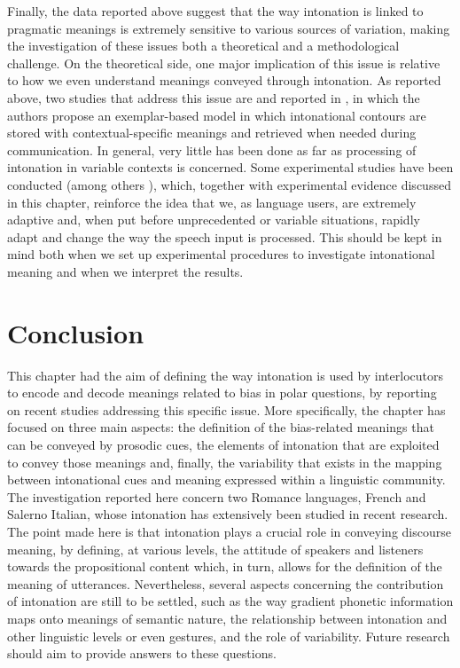 \documentclass[output=paper,colorlinks,citecolor=brown]{langscibook}
\begin{document}
Finally, the data reported above suggest that the way intonation is linked to pragmatic meanings is extremely sensitive to various sources of variation, making the investigation of these issues both a theoretical and a methodological challenge. On the theoretical side, one major implication of this issue is relative to how we even understand meanings conveyed through intonation. As reported above, two studies that address this issue are \citet{portesgerman2019} and \citet{germanportes2020} reported in , in which the authors propose an exemplar-based model in which intonational contours are stored with contextual-specific meanings and retrieved when needed during communication. In general, very little has been done as far as processing of intonation in variable contexts is concerned. Some experimental studies have been conducted (among others \citealt{kurumada2014or, roettger2020aa}), which, together with experimental evidence discussed in this chapter, reinforce the idea that we, as language users, are extremely adaptive and, when put before unprecedented or variable situations, rapidly adapt and change the way the speech input is processed. This should be kept in mind both when we set up experimental procedures to investigate intonational meaning and when we interpret the results.

\section{Conclusion}\label{conclude}
This chapter had the aim of defining the way intonation is used by interlocutors to encode and decode meanings related to bias in polar questions, by reporting on recent studies addressing this specific issue. More specifically, the chapter has focused on three main aspects: the definition of the bias-related meanings that can be conveyed by prosodic cues, the elements of intonation that are exploited to convey those meanings and, finally, the variability that exists in the mapping between intonational cues and meaning expressed within a linguistic community. The investigation reported here concern two Romance languages, French and Salerno Italian, whose intonation has extensively been studied in recent research. The point made here is that intonation plays a crucial role in conveying discourse meaning, by defining, at various levels, the attitude of speakers and listeners towards the propositional content which, in turn, allows for the definition of the meaning of utterances. Nevertheless, several aspects concerning the contribution of intonation are still to be settled, such as the way gradient phonetic information maps onto meanings of semantic nature, the relationship between intonation and other linguistic levels or even gestures, and the role of variability. Future research should aim to provide answers to these questions. 
{\sloppy\printbibliography[heading=subbibliography,notkeyword=this]}
\end{document}
